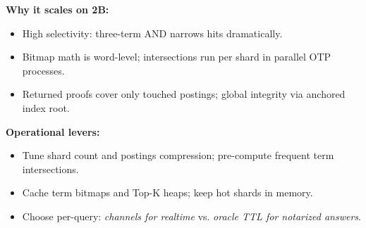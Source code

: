 \documentclass[11pt]{article}
\begin{document}
\textbf{Why it scales on 2B:}
\begin{itemize}[leftmargin=*]
  \item High selectivity: three-term AND narrows hits dramatically.
  \item Bitmap math is word-level; intersections run per shard in parallel OTP processes.
  \item Returned proofs cover only touched postings; global integrity via anchored index root.
\end{itemize}

\textbf{Operational levers:}
\begin{itemize}[leftmargin=*]
  \item Tune shard count and postings compression; pre-compute frequent term intersections.
  \item Cache term bitmaps and Top-K heaps; keep hot shards in memory.
  \item Choose per-query: \emph{channels for realtime} vs. \emph{oracle TTL for notarized answers}.
\end{itemize}
\end{document}
